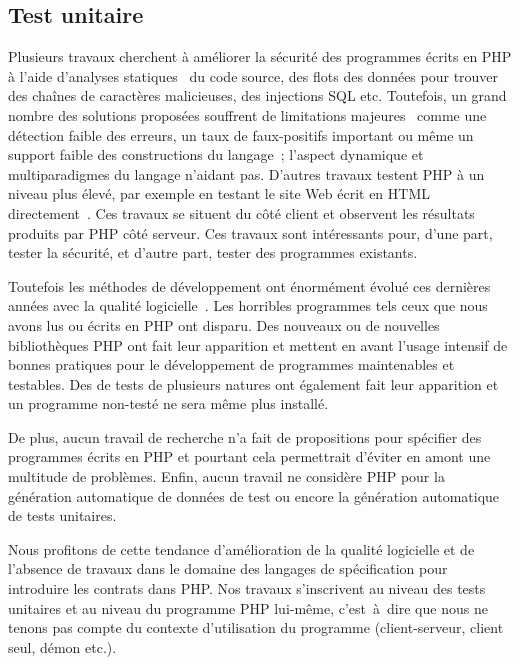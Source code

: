 \subsection{Test unitaire}

Plusieurs travaux cherchent à améliorer la sécurité des programmes écrits en PHP
à l'aide d'analyses statiques~ du code source, des flots des données pour trouver des
chaînes de caractères malicieuses, des injections SQL etc. Toutefois, un grand
nombre des solutions proposées souffrent de limitations
majeures~ comme une détection faible des erreurs, un taux de
faux-positifs important ou même un support faible des constructions du langage~;
l'aspect dynamique et multiparadigmes du langage n'aidant pas. D'autres travaux
testent PHP à un niveau plus élevé, par exemple en testant le site Web écrit en
HTML directement~.
Ces travaux se situent du côté client et observent les résultats produits par
PHP côté serveur. Ces travaux sont intéressants pour, d'une part, tester la
sécurité, et d'autre part, tester des programmes existants.

Toutefois les méthodes de développement ont énormément évolué ces dernières
années avec la qualité logicielle~. Les horribles programmes
tels ceux que nous avons lus ou écrits en PHP ont disparu. Des nouveaux
 ou de nouvelles bibliothèques PHP ont fait leur
apparition et mettent en avant l'usage intensif de bonnes pratiques pour le
développement de programmes maintenables et testables. Des
 de tests de plusieurs natures ont également fait leur
apparition et un programme non-testé ne sera même plus installé. 

De plus, aucun travail de recherche n'a fait de propositions pour spécifier des
programmes écrits en PHP et pourtant cela permettrait d'éviter en amont une
multitude de problèmes. Enfin, aucun travail ne considère PHP pour la génération
automatique de données de test ou encore la génération automatique de tests
unitaires.

Nous profitons de cette tendance d'amélioration de la qualité logicielle et de
l'absence de travaux dans le domaine des langages de spécification pour
introduire les contrats dans PHP. Nos travaux s'inscrivent au niveau des tests
unitaires et au niveau du programme PHP lui-même, c'est~à~dire que nous ne
tenons pas compte du contexte d'utilisation du programme (client-serveur, client
seul, démon etc.).

